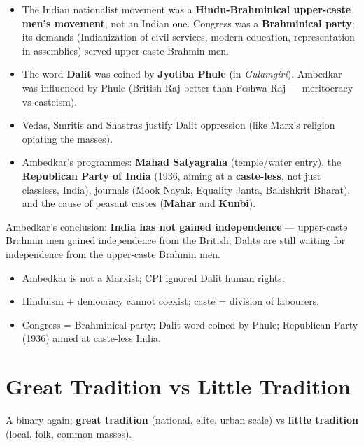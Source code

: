 \begin{itemize}
\item The Indian nationalist movement was a \textbf{Hindu-Brahminical upper-caste men's movement}, not an Indian one. Congress was a \textbf{Brahminical party}; its demands (Indianization of civil services, modern education, representation in assemblies) served upper-caste Brahmin men.
\item The word \textbf{Dalit} was coined by \textbf{Jyotiba Phule} (in \emph{Gulamgiri}). Ambedkar was influenced by Phule (British Raj better than Peshwa Raj --- meritocracy vs casteism).
\item Vedas, Smritis and Shastras justify Dalit oppression (like Marx's religion opiating the masses).
\item Ambedkar's programmes: \textbf{Mahad Satyagraha} (temple/water entry), the \textbf{Republican Party of India} (1936, aiming at a \textbf{caste-less}, not just classless, India), journals (Mook Nayak, Equality Janta, Bahishkrit Bharat), and the cause of peasant castes (\textbf{Mahar} and \textbf{Kunbi}).
\end{itemize}

\begin{CriticalPoint}
Ambedkar's conclusion: \textbf{India has not gained independence} --- upper-caste Brahmin men gained independence from the British; Dalits are still waiting for independence from the upper-caste Brahmin men.
\end{CriticalPoint}

\begin{QuickRevision}
\begin{itemize}
\item Ambedkar is not a Marxist; CPI ignored Dalit human rights.
\item Hinduism + democracy cannot coexist; caste = division of labourers.
\item Congress = Brahminical party; Dalit word coined by Phule; Republican Party (1936) aimed at caste-less India.
\end{itemize}
\end{QuickRevision}

\section{Great Tradition vs Little Tradition}

A binary again: \textbf{great tradition} (national, elite, urban scale) vs \textbf{little tradition} (local, folk, common masses).

